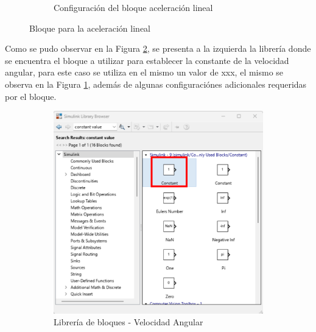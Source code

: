 \begin{figure}[htbp]
\begin{subfigure}[b]{0.45\textwidth}
        \caption{Configuración del bloque aceleración lineal}
        \label{fig:lib_bloques_config_linear_acceleration}
    \end{subfigure}
    \caption{Bloque para la aceleración lineal}
    \label{fig:linear_accel_block_simulink}
\end{figure}

Como se pudo observar en la Figura \ref{fig:linear_accel_block_simulink}, se presenta a la izquierda la librería donde se encuentra el bloque a utilizar para establecer la constante de la velocidad angular, para este caso se utiliza en el mismo un valor de xxx, el mismo se observa en la Figura \ref{fig:lib_bloques_config_linear_acceleration}, además de algunas configuraciónes adicionales requeridas por el bloque. 

\begin{figure}[htbp]
    \centering
    \begin{subfigure}[b]{0.45\textwidth}
        \centering
        \includegraphics[width=\textwidth]{fig/Capitulo5/Caso_de_estudio_IMU/Generador_de_archivos/libreria_de_bloques_constante_velocidad_angular.pdf}
        \caption{Librería de bloques - Velocidad Angular}
        \label{fig:lib_bloques_angular_velocity}
    \end{subfigure}
    \hfill
    \begin{subfigure}[b]{0.45\textwidth}
        \centering

\end{subfigure}
\end{figure}
